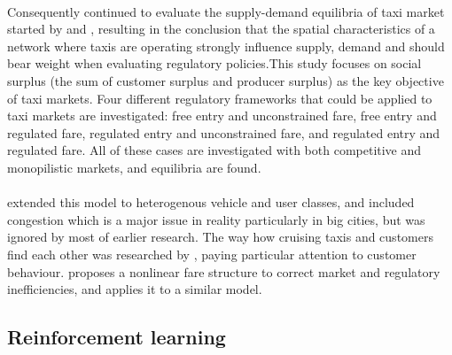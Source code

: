 \paragraph{}Consequently \textcite{Yang2002taxi+demand} continued to evaluate the supply-demand equilibria of taxi market started by \textcite{Yang1998taxi+network} and \textcite{Yang2000taxi+utilization}, resulting in the conclusion that the spatial characteristics of a network where taxis are operating strongly influence supply, demand and should bear weight when evaluating regulatory policies.This study focuses on social surplus (the sum of customer surplus and producer surplus) as the key objective of taxi markets. Four different regulatory frameworks that could be applied to taxi markets are investigated: free entry and unconstrained fare, free entry and regulated fare, regulated entry and unconstrained fare, and regulated entry and regulated fare. All of these cases are investigated with both competitive and monopilistic markets, and equilibria are found.
\paragraph{}
\textcite{Wong2008taxi+modeling} extended this model to heterogenous vehicle and user classes, and included congestion which is a major issue in reality particularly in big cities, but was ignored by most of earlier research. The way how cruising taxis and customers find each other was researched by \textcite{Yang2010taxi+equilibria}, paying particular attention to customer behaviour. \textcite{Yang2010taxi+nonlinear} proposes a nonlinear fare structure to correct market and regulatory inefficiencies, and applies it to a similar model.


\subsection{Reinforcement learning}